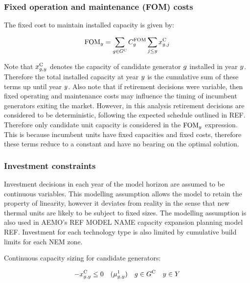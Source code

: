 \documentclass{article}
\begin{document}
\subsubsection{Fixed operation and maintenance (FOM) costs}
The fixed cost to maintain installed capacity is given by:

\begin{equation}
\cFixedOperationsMaintenanceCost = \sum\limits_{\iGenerator \in \sGeneratorsCandidate} \cFixedOperationsMaintenanceCostGenerator \sum\limits_{\iYearAlias \leq \iYear} \vInstalledCapacity[\iGenerator,\iYearAlias]
\end{equation}

Note that $\vInstalledCapacity$ denotes the capacity of candidate generator $\iGenerator$ installed in year $\iYear$. Therefore the total installed capacity at year $\iYear$ is the cumulative sum of these terms up until year $\iYear$. Also note that if retirement decisions were variable, then fixed operating and maintenance costs may influence the timing of incumbent generators exiting the market. However, in this analysis retirement decisions are considered to be deterministic, following the expected schedule outlined in REF. Therefore only candidate unit capacity is considered in the $\cFixedOperationsMaintenanceCost$ expression. This is because incumbent units have fixed capacities and fixed costs, therefore these terms reduce to a constant and have no bearing on the optimal solution. 

\subsubsection{Investment constraints}
Investment decisions in each year of the model horizon are assumed to be continuous variables. This modelling assumption allows the model to retain the property of linearity, however it deviates from reality in the sense that new thermal units are likely to be subject to fixed sizes. The modelling assumption is also used in AEMO's REF MODEL NAME capacity expansion planning model REF. Investment for each technology type is also limited by cumulative build limits for each NEM zone.

Continuous capacity sizing for candidate generators:

\begin{equation}
- \vInstalledCapacity[\iGenerator,\iYear] \leq 0 \quad (\dNonNegativeCandidateCapacity) \quad  \iGenerator \in \sGeneratorsCandidate \quad  \iYear \in \sYears
\label{eqn: non-negative installed capacity}
\end{equation}
\end{document}
